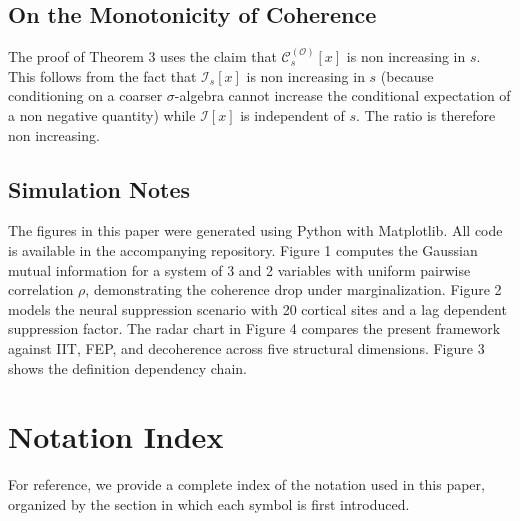 \documentclass[12pt]{article}
\theoremstyle{definition}
\begin{document}
\subsection{On the Monotonicity of Coherence}
The proof of Theorem 3 uses the claim that $\mathcal{C}_s^{(\mathcal{O})}[x]$ is non increasing in $s$. This follows from the fact that $\mathcal{I}_s[x]$ is non increasing in $s$ (because conditioning on a coarser $\sigma$-algebra cannot increase the conditional expectation of a non negative quantity) while $\mathcal{I}[x]$ is independent of $s$. The ratio is therefore non increasing.

\subsection{Simulation Notes}
The figures in this paper were generated using Python with Matplotlib. All code is available in the accompanying repository. Figure 1 computes the Gaussian mutual information for a system of 3 and 2 variables with uniform pairwise correlation $\rho$, demonstrating the coherence drop under marginalization. Figure 2 models the neural suppression scenario with 20 cortical sites and a lag dependent suppression factor. The radar chart in Figure 4 compares the present framework against IIT, FEP, and decoherence across five structural dimensions. Figure 3 shows the definition dependency chain.

\section{Notation Index}

For reference, we provide a complete index of the notation used in this paper, organized by the section in which each symbol is first introduced.
\end{document}
